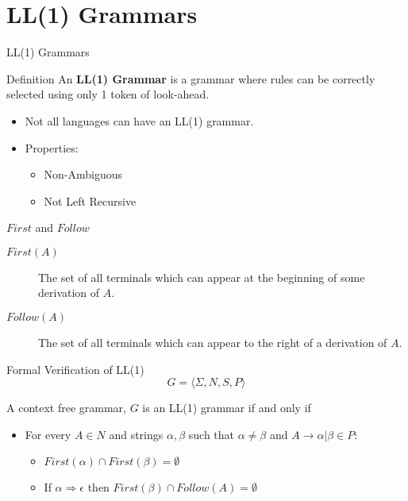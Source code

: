 \documentclass[handout]{beamer}
\begin{document}
\section{LL(1) Grammars}
\begin{frame}{LL(1) Grammars}
    \begin{block}{Definition}
        An {\bf LL(1) Grammar} is a grammar where rules can be correctly selected using
        only 1 token of look-ahead.
    \end{block}
    
    \begin{itemize}
        \item Not all languages can have an LL(1) grammar.
        \item Properties:
        \begin{itemize}
            \item Non-Ambiguous
            \item Not Left Recursive
        \end{itemize}
    \end{itemize}
\end{frame}

\begin{frame}{$First$ and $Follow$}
    \begin{description}
        \item[$First(A)$] The set of all terminals which can appear at the beginning of some derivation of $A$.
        \item[$Follow(A)$] The set of all terminals which can appear to the right of a derivation of $A$.
    \end{description}
\end{frame}

\begin{frame}{Formal Verification of LL(1)}
\[
G = \langle \Sigma,N,S,P\rangle
\]

A context free grammar, $G$ is an LL(1) grammar if and only if
\begin{itemize}
    \item For every $A\in N$ and strings $\alpha,\beta$ such that $\alpha \neq \beta$ and $A\rightarrow \alpha|\beta \in P$:
    \begin{itemize}
        \item $First(\alpha) \cap First(\beta)=\emptyset$
        \item If $\alpha \Rightarrow \epsilon$ then $First(\beta)\cap Follow(A) = \emptyset$
    \end{itemize}
\end{itemize}
\end{frame}
\end{document}
